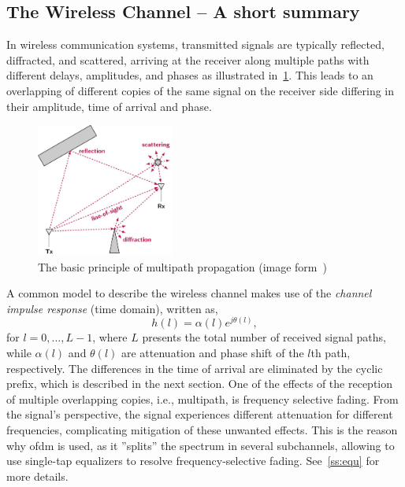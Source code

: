 \subsection{The Wireless Channel -- A short summary}
In wireless communication systems, transmitted signals are typically reflected, diffracted, and scattered, arriving at the receiver along multiple paths with different delays, amplitudes, and phases as illustrated in~\cref{fig:multipath}. This leads to an overlapping of different copies of the same signal on the receiver side differing in their amplitude, time of arrival and phase. 
%
\begin{figure}[htbp]
\centering
\includegraphics[width=0.4\textwidth]{figs/Some-effects-causing-multipath-propagation.png}
\caption{The basic principle of multipath propagation (image form~\cite{milosevic2021key})}\label{fig:multipath}
\end{figure}
%
A common model to describe the wireless channel makes use of the \textit{channel impulse response} (time domain), written as,
\begin{equation}
h(l)=\alpha(l) e^{j\theta(l)},
\end{equation} for $l = 0,\ldots,L-1 $, where $L$ presents the total number of received signal paths, while $\alpha(l)$ and $ \theta(l)$ are attenuation and phase shift of the $l$th path, respectively. The differences in the time of arrival are eliminated by the cyclic prefix, which is described in the next section. One of the effects of the reception of multiple overlapping copies, i.e., multipath, is frequency selective fading. From the signal's perspective, the signal experiences different attenuation for different frequencies, complicating mitigation of these unwanted effects. This is the reason why \gls{ofdm} is used, as it ''splits'' the spectrum in several subchannels, allowing to use single-tap equalizers to resolve frequency-selective fading. See~\cref{ss:equ} for more details.


